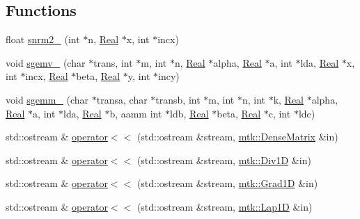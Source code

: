 \subsection*{Functions}
\begin{DoxyCompactItemize}
\item 
float \hyperlink{namespacemtk_af817d9da07e2c0b4c49ee02fdb09471c}{snrm2\-\_\-} (int $\ast$n, \hyperlink{group__c01-roots_gac080bbbf5cbb5502c9f00405f894857d}{Real} $\ast$x, int $\ast$incx)
\item 
void \hyperlink{namespacemtk_aafa6617e6f999afa44dfb2573f5d847e}{sgemv\-\_\-} (char $\ast$trans, int $\ast$m, int $\ast$n, \hyperlink{group__c01-roots_gac080bbbf5cbb5502c9f00405f894857d}{Real} $\ast$alpha, \hyperlink{group__c01-roots_gac080bbbf5cbb5502c9f00405f894857d}{Real} $\ast$a, int $\ast$lda, \hyperlink{group__c01-roots_gac080bbbf5cbb5502c9f00405f894857d}{Real} $\ast$x, int $\ast$incx, \hyperlink{group__c01-roots_gac080bbbf5cbb5502c9f00405f894857d}{Real} $\ast$beta, \hyperlink{group__c01-roots_gac080bbbf5cbb5502c9f00405f894857d}{Real} $\ast$y, int $\ast$incy)
\item 
void \hyperlink{namespacemtk_aec80332e88a0a7cdce8798a18559e961}{sgemm\-\_\-} (char $\ast$transa, char $\ast$transb, int $\ast$m, int $\ast$n, int $\ast$k, \hyperlink{group__c01-roots_gac080bbbf5cbb5502c9f00405f894857d}{Real} $\ast$alpha, \hyperlink{group__c01-roots_gac080bbbf5cbb5502c9f00405f894857d}{Real} $\ast$a, int $\ast$lda, \hyperlink{group__c01-roots_gac080bbbf5cbb5502c9f00405f894857d}{Real} $\ast$b, aamm int $\ast$ldb, \hyperlink{group__c01-roots_gac080bbbf5cbb5502c9f00405f894857d}{Real} $\ast$beta, \hyperlink{group__c01-roots_gac080bbbf5cbb5502c9f00405f894857d}{Real} $\ast$c, int $\ast$ldc)
\item 
std\-::ostream \& \hyperlink{namespacemtk_ad3bcf52cda59ddb5fc7b4bdce76c46dc}{operator$<$$<$} (std\-::ostream \&stream, \hyperlink{classmtk_1_1DenseMatrix}{mtk\-::\-Dense\-Matrix} \&in)
\item 
std\-::ostream \& \hyperlink{namespacemtk_a12db5e6fff3788f728819a60d5c28d01}{operator$<$$<$} (std\-::ostream \&stream, \hyperlink{classmtk_1_1Div1D}{mtk\-::\-Div1\-D} \&in)
\item 
std\-::ostream \& \hyperlink{namespacemtk_a3f546b8a3743b8719db17e33f2d7ef7f}{operator$<$$<$} (std\-::ostream \&stream, \hyperlink{classmtk_1_1Grad1D}{mtk\-::\-Grad1\-D} \&in)
\item 
std\-::ostream \& \hyperlink{namespacemtk_af667c01a388ef1815d549b09b2d76bcc}{operator$<$$<$} (std\-::ostream \&stream, \hyperlink{classmtk_1_1Lap1D}{mtk\-::\-Lap1\-D} \&in)

\end{DoxyCompactItemize}
